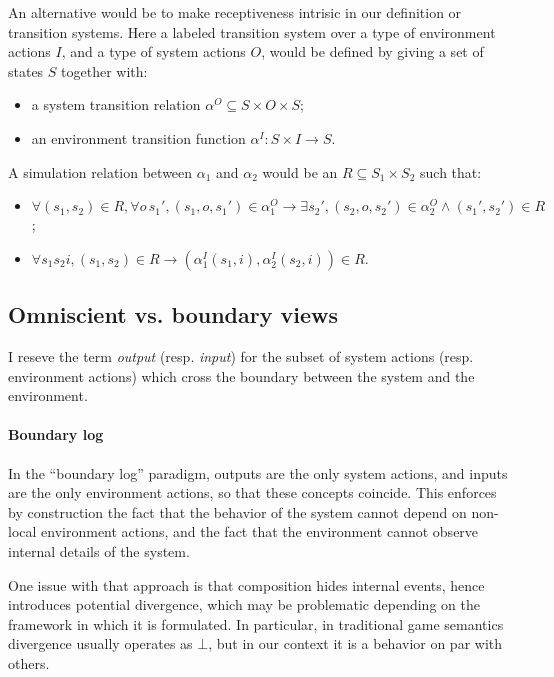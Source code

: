 \documentclass[11pt]{article}
\begin{document}
An alternative would be to make receptiveness intrisic
in our definition or transition systems.
Here a labeled transition system over
a type of environment actions $I$, and
a type of system actions $O$,
would be defined by giving a set of states $S$ together with:
\begin{itemize}
\item a system transition relation $\alpha^O \subseteq S \times O \times S$;
\item an environment transition function $\alpha^I : S \times I \rightarrow S$.
\end{itemize}
A simulation relation between $\alpha_1$ and $\alpha_2$
would be an $R \subseteq S_1 \times S_2$ such that:
\begin{itemize}
\item $\forall (s_1, s_2) \in R,
  \forall o \, s_1', (s_1, o, s_1') \in \alpha_1^O \rightarrow
  \exists s_2', (s_2, o, s_2') \in \alpha_2^O \wedge (s_1', s_2') \in R$;
\item $\forall s_1 s_2 i, (s_1, s_2) \in R \rightarrow
  (\alpha^I_1(s_1, i), \alpha^I_2(s_2, i)) \in R$.
\end{itemize}



\subsection{Omniscient vs. boundary views} %

I reseve the term \emph{output} (resp. \emph{input})
for the subset of system actions (resp. environment actions)
which cross the boundary between the system and the environment.

\paragraph{Boundary log}

In the ``boundary log'' paradigm,
outputs are the only system actions, and
inputs are the only environment actions,
so that these concepts coincide.
This enforces by construction
the fact that the behavior of the system
cannot depend on non-local environment actions,
and the fact that the environment
cannot observe internal details of the system.

One issue with that approach is that
composition hides internal events,
hence introduces potential divergence,
which may be problematic depending on the
framework in which it is formulated.
In particular,
in traditional game semantics
divergence usually operates as $\bot$,
but in our context it is a behavior on par with others.
\end{document}
